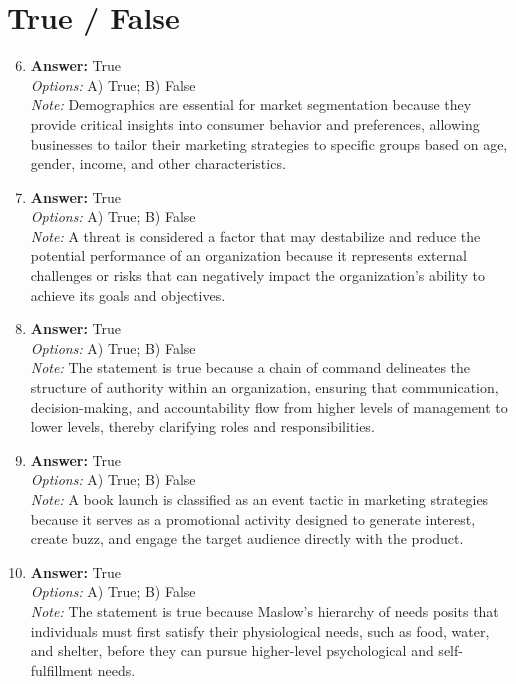 \documentclass[12pt]{article}
\begin{document}
\section*{True / False}
\begin{enumerate}[label=\arabic*.]
\setcounter{enumi}{5}
\item \textbf{Answer:} True
\\ \textit{Options:} A) True; B) False
\\ \textit{Note:} Demographics are essential for market segmentation because they provide critical insights into consumer behavior and preferences, allowing businesses to tailor their marketing strategies to specific groups based on age, gender, income, and other characteristics.
\item \textbf{Answer:} True
\\ \textit{Options:} A) True; B) False
\\ \textit{Note:} A threat is considered a factor that may destabilize and reduce the potential performance of an organization because it represents external challenges or risks that can negatively impact the organization's ability to achieve its goals and objectives.
\item \textbf{Answer:} True
\\ \textit{Options:} A) True; B) False
\\ \textit{Note:} The statement is true because a chain of command delineates the structure of authority within an organization, ensuring that communication, decision-making, and accountability flow from higher levels of management to lower levels, thereby clarifying roles and responsibilities.
\item \textbf{Answer:} True
\\ \textit{Options:} A) True; B) False
\\ \textit{Note:} A book launch is classified as an event tactic in marketing strategies because it serves as a promotional activity designed to generate interest, create buzz, and engage the target audience directly with the product.
\item \textbf{Answer:} True
\\ \textit{Options:} A) True; B) False
\\ \textit{Note:} The statement is true because Maslow's hierarchy of needs posits that individuals must first satisfy their physiological needs, such as food, water, and shelter, before they can pursue higher-level psychological and self-fulfillment needs.
\end{enumerate}
\end{document}
